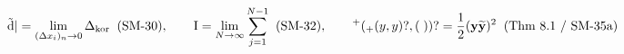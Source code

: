 \documentclass[preview]{standalone}
\begin{document}
\begin{align*}
\special{dvisvgm:raw <g id='unique000'>}\tilde{\mathrm{d}}| = \lim_{(\Delta x_i)_n\to 0} \Delta_{\text{kor}}\;\;(\text{SM-30}), \qquad \mathrm{I} = \lim_{N\to\infty}\sum_{j=1}^{N-1}\;\;(\text{SM-32}), \qquad {}^+\!\left({}_+(y,y)?,(\;)\right)? = \frac{1}{2}(\mathbf{y}\widetilde{\mathbf{y}})^2\;\;(\text{Thm 8.1 / SM-35a})\special{dvisvgm:raw </g>}
\end{align*}
\end{document}
